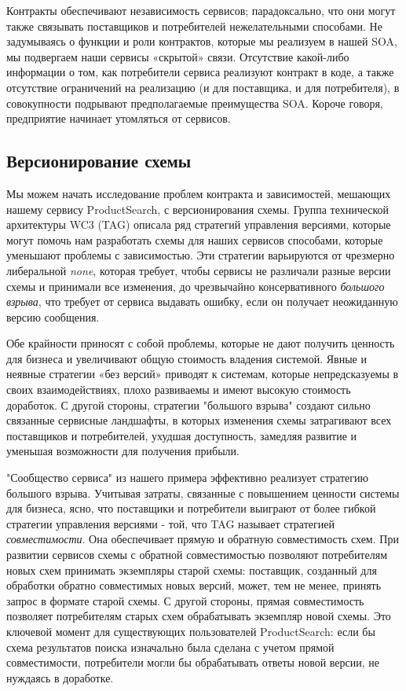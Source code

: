 \documentclass[11pt]{article}
\begin{document}
Контракты обеспечивают независимость сервисов; парадоксально, что они
могут также связывать поставщиков и потребителей нежелательными
способами. Не задумываясь о функции и роли контрактов, которые мы
реализуем в нашей SOA, мы подвергаем наши сервисы «скрытой» связи.
Отсутствие какой-либо информации о том, как потребители сервиса
реализуют контракт в коде, а также отсутствие ограничений на реализацию
(и для поставщика, и для потребителя), в совокупности подрывают
предполагаемые преимущества SOA. Короче говоря, предприятие начинает
утомляться от сервисов.

    \subsection{Версионирование
схемы}\label{ux432ux435ux440ux441ux438ux43eux43dux438ux440ux43eux432ux430ux43dux438ux435-ux441ux445ux435ux43cux44b}

Мы можем начать исследование проблем контракта и зависимостей, мешающих
нашему сервису ProductSearch, с версионирования схемы. Группа
технической архитектуры WC3 (TAG) описала ряд стратегий управления
версиями, которые могут помочь нам разработать схемы для наших сервисов
способами, которые уменьшают проблемы с зависимостью. Эти стратегии
варьируются от чрезмерно либеральной \emph{none}, которая требует, чтобы
сервисы не различали разные версии схемы и принимали все изменения, до
чрезвычайно консервативного \emph{большого взрыва}, что требует от
сервиса выдавать ошибку, если он получает неожиданную версию сообщения.

Обе крайности приносят с собой проблемы, которые не дают получить
ценность для бизнеса и увеличивают общую стоимость владения системой.
Явные и неявные стратегии «без версий» приводят к системам, которые
непредсказуемы в своих взаимодействиях, плохо развиваемы и имеют высокую
стоимость доработок. С другой стороны, стратегии "большого взрыва"
создают сильно связанные сервисные ландшафты, в которых изменения схемы
затрагивают всех поставщиков и потребителей, ухудшая доступность,
замедляя развитие и уменьшая возможности для получения прибыли.

"Сообщество сервиса" из нашего примера эффективно реализует стратегию
большого взрыва. Учитывая затраты, связанные с повышением ценности
системы для бизнеса, ясно, что поставщики и потребители выиграют от
более гибкой стратегии управления версиями - той, что TAG называет
стратегией \emph{совместимости}. Она обеспечивает прямую и обратную
совместимость схем. При развитии сервисов схемы с обратной
совместимостью позволяют потребителям новых схем принимать экземпляры
старой схемы: поставщик, созданный для обработки обратно совместимых
новых версий, может, тем не менее, принять запрос в формате старой
схемы. С другой стороны, прямая совместимость позволяет потребителям
старых схем обрабатывать экземпляр новой схемы. Это ключевой момент для
существующих пользователей ProductSearch: если бы схема результатов
поиска изначально была сделана с учетом прямой совместимости,
потребители могли бы обрабатывать ответы новой версии, не нуждаясь в
доработке.
\end{document}
